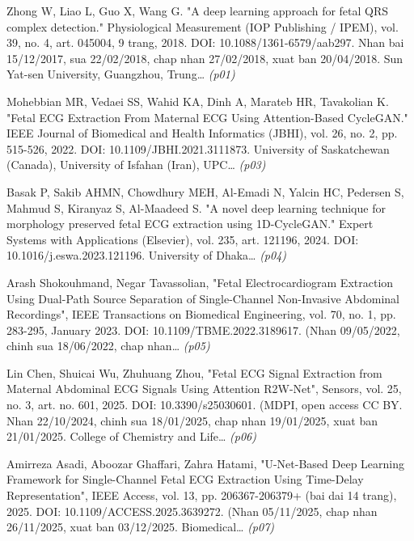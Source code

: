 \begin{enumerate}[leftmargin=1.6em,itemsep=2pt,label={[\arabic*]}]
\item {\small Zhong W, Liao L, Guo X, Wang G. "A deep learning approach for fetal QRS complex detection." Physiological Measurement (IOP Publishing / IPEM), vol. 39, no. 4, art. 045004, 9 trang, 2018. DOI: 10.1088/1361-6579/aab297. Nhan bai 15/12/2017, sua 22/02/2018, chap nhan 27/02/2018, xuat ban 20/04/2018. Sun Yat-sen University, Guangzhou, Trung…} \hfill{\scriptsize\itshape (p01)}
\item {\small Mohebbian MR, Vedaei SS, Wahid KA, Dinh A, Marateb HR, Tavakolian K. "Fetal ECG Extraction From Maternal ECG Using Attention-Based CycleGAN." IEEE Journal of Biomedical and Health Informatics (JBHI), vol. 26, no. 2, pp. 515-526, 2022. DOI: 10.1109/JBHI.2021.3111873. University of Saskatchewan (Canada), University of Isfahan (Iran), UPC…} \hfill{\scriptsize\itshape (p03)}
\item {\small Basak P, Sakib AHMN, Chowdhury MEH, Al-Emadi N, Yalcin HC, Pedersen S, Mahmud S, Kiranyaz S, Al-Maadeed S. "A novel deep learning technique for morphology preserved fetal ECG extraction using 1D-CycleGAN." Expert Systems with Applications (Elsevier), vol. 235, art. 121196, 2024. DOI: 10.1016/j.eswa.2023.121196. University of Dhaka…} \hfill{\scriptsize\itshape (p04)}
\item {\small Arash Shokouhmand, Negar Tavassolian, "Fetal Electrocardiogram Extraction Using Dual-Path Source Separation of Single-Channel Non-Invasive Abdominal Recordings", IEEE Transactions on Biomedical Engineering, vol. 70, no. 1, pp. 283-295, January 2023. DOI: 10.1109/TBME.2022.3189617. (Nhan 09/05/2022, chinh sua 18/06/2022, chap nhan…} \hfill{\scriptsize\itshape (p05)}
\item {\small Lin Chen, Shuicai Wu, Zhuhuang Zhou, "Fetal ECG Signal Extraction from Maternal Abdominal ECG Signals Using Attention R2W-Net", Sensors, vol. 25, no. 3, art. no. 601, 2025. DOI: 10.3390/s25030601. (MDPI, open access CC BY. Nhan 22/10/2024, chinh sua 18/01/2025, chap nhan 19/01/2025, xuat ban 21/01/2025. College of Chemistry and Life…} \hfill{\scriptsize\itshape (p06)}
\item {\small Amirreza Asadi, Aboozar Ghaffari, Zahra Hatami, "U-Net-Based Deep Learning Framework for Single-Channel Fetal ECG Extraction Using Time-Delay Representation", IEEE Access, vol. 13, pp. 206367-206379+ (bai dai 14 trang), 2025. DOI: 10.1109/ACCESS.2025.3639272. (Nhan 05/11/2025, chap nhan 26/11/2025, xuat ban 03/12/2025. Biomedical…} \hfill{\scriptsize\itshape (p07)}

\end{enumerate}
